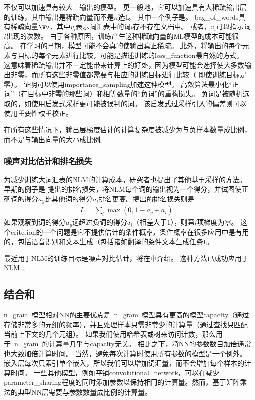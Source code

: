 不仅可以加速具有较大~~输出的模型。
更一般地，它可以加速具有大稀疏输出层的训练，其中输出是稀疏向量而不是$n$选$1$。
其中一个例子是。
\gls{bag_of_words}具有稀疏向量$\Vv$，其中$v_i$表示词汇表中的词$i$存不存在文档中。
或者，$v_i$可以指示词$i$出现的次数。
由于各种原因，训练产生这种稀疏向量的\gls{ML}模型的成本可能很高。
在学习的早期，模型可能不会真的使输出真正稀疏。
此外，将输出的每个元素与目标的每个元素进行比较，可能是描述训练的\gls{loss_function}最自然的方式。
这意味着稀疏输出并不一定能带来计算上的好处，因为模型可能会选择使大多数输出非零，而所有这些非零值都需要与相应的训练目标进行比较（ 即使训练目标是零）。
\citet{Dauphin2011-small} 证明可以使用\gls{importance_sampling}加速这种模型。
高效算法最小化``正词''（在目标中非零的那些词）和相等数量的``负词''的重构损失。
负词是被随机选取的，如使用启发式采样更可能被误判的词。
该启发式过采样引入的偏差则可以使用重要性权重校正。


在所有这些情况下，输出层梯度估计的计算复杂度被减少为与负样本数量成比例，而不是与输出向量的大小成比例。


\subsubsection{噪声对比估计和排名损失}


\label{sec:combining_neural_language_models_with_n_grams}
为减少训练大词汇表的\gls{NLM}的计算成本，研究者也提出了其他基于采样的方法。
早期的例子是 \citet{Collobert+Weston-ICML2008}提出的排名损失，将\gls{NLM}每个词的输出视为一个得分，并试图使正确词的得分$a_y$比其他词的得分$a_i$排名更高。提出的排名损失则是
\begin{align} 
 L = \sum_i \max(0,1-a_y+a_i).
\end{align} 
如果观察到词的得分$a_y$远超过负词的得分$a_i$（相差大于1），则第$i$项梯度为零。
这个\gls{criterion}的一个问题是它不提供估计的条件概率，条件概率在很多应用中是有用的，包括语音识别和文本生成（包括诸如翻译的条件文本生成任务）。

最近用于\gls{NLM}的训练目标是噪声对比估计，将在中介绍。
这种方法已成功应用于\gls{NLM}~\citep{Mnih+Teh-ICML2012,Mnih2013}。


\subsection{结合和}
\gls{n_gram}~模型相对\gls{NN}的主要优点是~\gls{n_gram}~模型具有更高的模型\gls{capacity}（通过存储非常多的元组的频率），并且处理样本只需非常少的计算量（通过查找只匹配当前上下文的几个元组）。
如果我们使用哈希表或树来访问计数，那么用于~\gls{n_gram}~的计算量几乎与\gls{capacity}无关。
相比之下，将\gls{NN}的参数数目加倍通常也大致加倍计算时间。
当然，避免每次计算时使用所有参数的模型是一个例外。
嵌入层每次只索引单个嵌入，所以我们可以增加词汇量，而不会增加每个样本的计算时间。
一些其他模型，例如平铺\gls{convolutional_network}，可以在减少\gls{parameter_sharing}程度的同时添加参数以保持相同的计算量。然而，基于矩阵乘法的典型\gls{NN}层需要与参数数量成比例的计算量。

